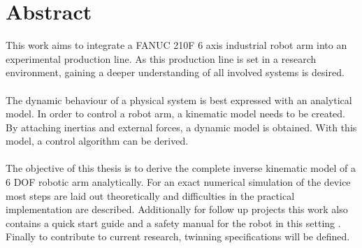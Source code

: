 \section{Abstract}

This work aims to integrate a FANUC 210F 6 axis industrial robot arm  into an experimental production line. 
As this production line is set in a research environment, gaining a deeper understanding of all involved systems is desired.\\
\\
The dynamic behaviour of a physical system is best expressed with an analytical model.
In order to control a robot arm, a kinematic model needs to be created. By attaching inertias and external forces, a dynamic model is obtained. With this model, a control algorithm can be derived.\\
\\
The objective of this thesis is to derive the complete inverse kinematic model of a 6 \ac{DOF} robotic arm analytically. For an exact numerical simulation of the device most steps are laid out theoretically and difficulties in the practical implementation are described.
Additionally for follow up projects this work also contains a quick start guide and a safety manual for the robot in this setting .
Finally to contribute to current research, twinning specifications will be defined.


